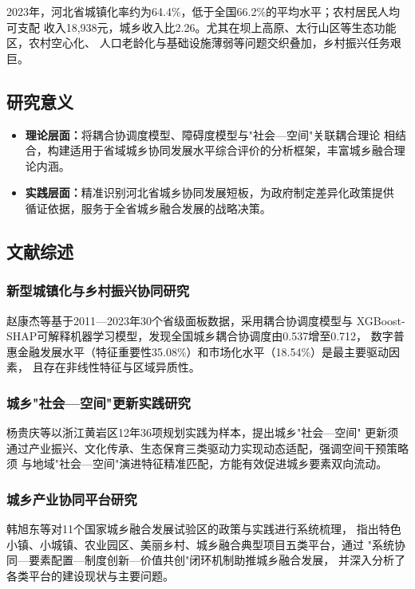 \documentclass[12pt, a4paper, twoside]{ctexart}
\begin{document}
2023年，河北省城镇化率约为64.4\%，低于全国66.2\%的平均水平；农村居民人均可支配
收入18,938元，城乡收入比2.26。尤其在坝上高原、太行山区等生态功能区，农村空心化、
人口老龄化与基础设施薄弱等问题交织叠加，乡村振兴任务艰巨。

\subsection{研究意义}

\begin{itemize}[leftmargin=2em, itemsep=2pt]
  \item \textbf{理论层面：}将耦合协调度模型、障碍度模型与"社会—空间"关联耦合理论
        相结合，构建适用于省域城乡协同发展水平综合评价的分析框架，丰富城乡融合理论内涵。
  \item \textbf{实践层面：}精准识别河北省城乡协同发展短板，为政府制定差异化政策提供
        循证依据，服务于全省城乡融合发展的战略决策。
\end{itemize}

\subsection{文献综述}

\subsubsection{新型城镇化与乡村振兴协同研究}

赵康杰等\cite{zhao2026}基于2011—2023年30个省级面板数据，采用耦合协调度模型与
XGBoost-SHAP可解释机器学习模型，发现全国城乡耦合协调度由0.537增至0.712，
数字普惠金融发展水平（特征重要性35.08\%）和市场化水平（18.54\%）是最主要驱动因素，
且存在非线性特征与区域异质性。

\subsubsection{城乡"社会—空间"更新实践研究}

杨贵庆等\cite{yang2026}以浙江黄岩区12年36项规划实践为样本，提出城乡"社会—空间"
更新须通过产业振兴、文化传承、生态保育三类驱动力实现动态适配，强调空间干预策略须
与地域"社会—空间"演进特征精准匹配，方能有效促进城乡要素双向流动。

\subsubsection{城乡产业协同平台研究}

韩旭东等\cite{han2025}对11个国家城乡融合发展试验区的政策与实践进行系统梳理，
指出特色小镇、小城镇、农业园区、美丽乡村、城乡融合典型项目五类平台，通过
"系统协同—要素配置—制度创新—价值共创"闭环机制助推城乡融合发展，
并深入分析了各类平台的建设现状与主要问题。
\end{document}
